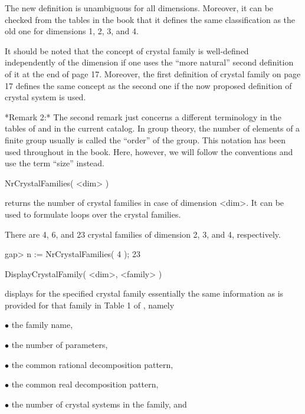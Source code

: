 The new definition is unambiguous for all dimensions. Moreover, it can be
checked  from  the   tables   in the  book   that  it   defines  the same
classification as the old one for dimensions 1, 2, 3, and 4.

It should  be noted that  the concept of  crystal  family is well-defined
independently of the dimension if one uses the ``more natural'' second
definition of it at the end of page 17. Moreover, the first definition of
crystal family on page  17 defines the same concept  as the second one if
the now proposed definition of crystal system is used.


*Remark 2:*
The second remark just concerns a  different terminology in the tables of
\cite{BBNWZ78} and in the current catalog. In group theory, the number of
elements of a  finite group  usually is  called  the ``order'' of  the
group.   This notation has  been  used throughout   in  the book.   Here,
however,  we  will follow the    {\GAP}   conventions and use  the   term
``size'' instead.



\>NrCrystalFamilies( <dim> )

returns the number of crystal families in case of dimension <dim>.  It
can be used to formulate loops over the crystal families.

There are 4, 6, and 23 crystal families of dimension 2, 3, and 4,
respectively.

\beginexample
gap> n := NrCrystalFamilies( 4 );
23
\endexample

\>DisplayCrystalFamily( <dim>, <family> )

displays for the specified crystal family essentially the same
information as is provided for that family in Table 1 of
\cite{BBNWZ78}, namely

\beginlist%
\item{$\bullet$} the family name,

\item{$\bullet$} the number of parameters,

\item{$\bullet$} the common rational decomposition pattern,

\item{$\bullet$} the common real decomposition pattern,

\item{$\bullet$} the number of crystal systems in the family, and

